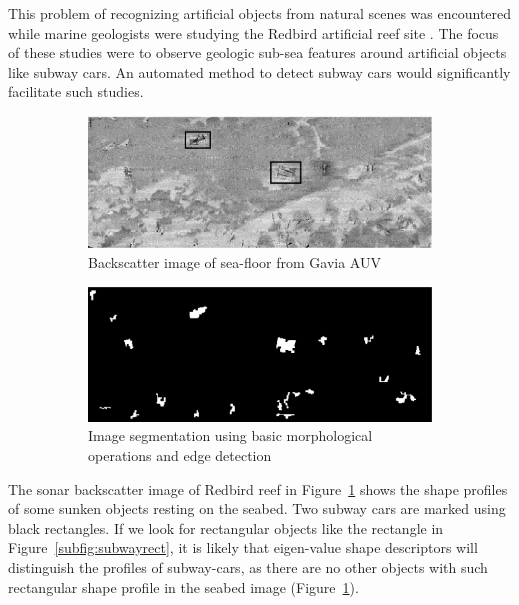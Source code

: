 \documentclass {udthesis}
\begin{document}
This problem of recognizing artificial objects from natural scenes was encountered while marine geologists were studying the Redbird artificial reef site \cite{redbird_nicole, redbird_art}. The focus of these studies were to observe geologic sub-sea features around artificial objects like subway cars. An automated method to detect subway cars would significantly facilitate such studies. 

\begin{figure}
  \begin{subfigure}[]{0.9\textwidth}
      \includegraphics[width=\textwidth]{subwayorig}
      \caption{Backscatter image of sea-floor from Gavia AUV}
      \label{subfig:subwayorig}
  \end{subfigure}
  \begin{subfigure}[]{0.9\textwidth}
      \includegraphics[width=\textwidth]{subwaysegment}
      \caption{Image segmentation using basic morphological operations and edge detection}
      \label{subfig:subwaysegment}
  \end{subfigure}
\caption[Analysis of sonar backscatter image of Redbird reef]{}
\end{figure}

The sonar backscatter image of Redbird reef in Figure~\ref{subfig:subwayorig} shows the shape profiles of some sunken objects resting on the seabed. Two subway cars are marked using black rectangles. If we look for rectangular objects like the rectangle in Figure~\ref{subfig:subwayrect}, it is likely that eigen-value shape descriptors will distinguish the profiles of subway-cars, as there are no other objects with such rectangular shape profile in the seabed image (Figure~\ref{subfig:subwayorig}). 
\end{document}
